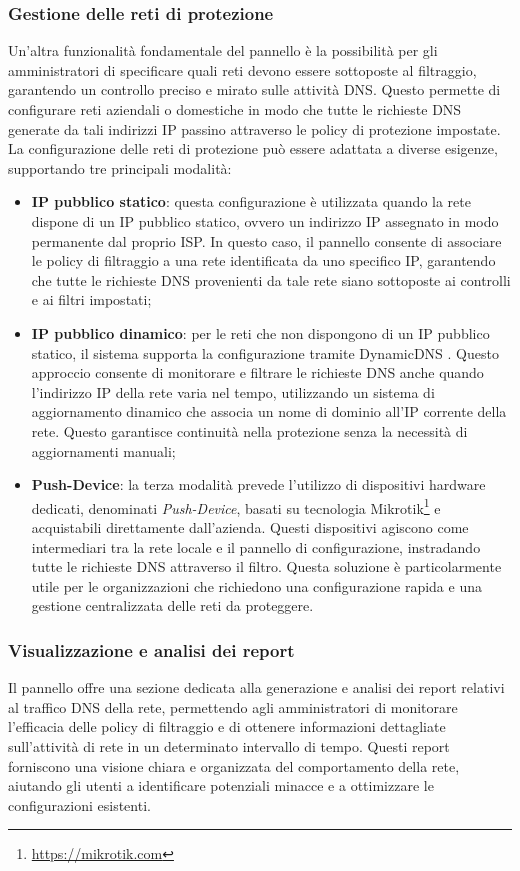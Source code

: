 \subsubsection{Gestione delle reti di protezione}
Un'altra funzionalità fondamentale del pannello è la possibilità per gli amministratori di specificare quali reti devono essere sottoposte al filtraggio, garantendo un controllo preciso e mirato sulle attività DNS. Questo permette di configurare reti aziendali o domestiche in modo che tutte le richieste DNS generate da tali indirizzi IP passino attraverso le policy di protezione impostate. La configurazione delle reti di protezione può essere adattata a diverse esigenze, supportando tre principali modalità:
\begin{itemize}
  \item \textbf{IP pubblico statico}: questa configurazione è utilizzata quando la rete dispone di un IP pubblico statico, ovvero un indirizzo IP assegnato in modo permanente dal proprio ISP. In questo caso, il pannello consente di associare le policy di filtraggio a una rete identificata da uno specifico IP, garantendo che tutte le richieste DNS provenienti da tale rete siano sottoposte ai controlli e ai filtri impostati;

  \item \textbf{IP pubblico dinamico}: per le reti che non dispongono di un IP pubblico statico, il sistema supporta la configurazione tramite DynamicDNS \cite{rfc2136}. Questo approccio consente di monitorare e filtrare le richieste DNS anche quando l’indirizzo IP della rete varia nel tempo, utilizzando un sistema di aggiornamento dinamico che associa un nome di dominio all’IP corrente della rete. Questo garantisce continuità nella protezione senza la necessità di aggiornamenti manuali;

  \item \textbf{Push-Device}: la terza modalità prevede l’utilizzo di dispositivi hardware dedicati, denominati \textit{Push-Device}, basati su tecnologia Mikrotik\footnote{\url{https://mikrotik.com}} e acquistabili direttamente dall’azienda. Questi dispositivi agiscono come intermediari tra la rete locale e il pannello di configurazione, instradando tutte le richieste DNS attraverso il filtro. Questa soluzione è particolarmente utile per le organizzazioni che richiedono una configurazione rapida e una gestione centralizzata delle reti da proteggere.
\end{itemize}

\subsubsection{Visualizzazione e analisi dei report}
Il pannello offre una sezione dedicata alla generazione e analisi dei report relativi al traffico DNS della rete, permettendo agli amministratori di monitorare l’efficacia delle policy di filtraggio e di ottenere informazioni dettagliate sull’attività di rete in un determinato intervallo di tempo. Questi report forniscono una visione chiara e organizzata del comportamento della rete, aiutando gli utenti a identificare potenziali minacce e a ottimizzare le configurazioni esistenti.

